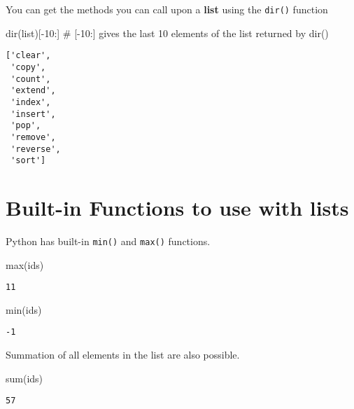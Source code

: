 \documentclass[
  letterpaper,
  DIV=11,
  numbers=noendperiod]{scrreprt}
\newenvironment{Shaded}{\begin{snugshade}}{\end{snugshade}}
\newcommand{\BuiltInTok}[1]{\textcolor[rgb]{0.00,0.23,0.31}{#1}}
\newcommand{\CommentTok}[1]{\textcolor[rgb]{0.37,0.37,0.37}{#1}}
\newcommand{\DecValTok}[1]{\textcolor[rgb]{0.68,0.00,0.00}{#1}}
\newcommand{\NormalTok}[1]{\textcolor[rgb]{0.00,0.23,0.31}{#1}}
\newcommand{\OperatorTok}[1]{\textcolor[rgb]{0.37,0.37,0.37}{#1}}
\begin{document}
You can get the methods you can call upon a \textbf{list} using the
\texttt{dir()} function

\begin{Shaded}
\begin{Highlighting}[]
\BuiltInTok{dir}\NormalTok{(}\BuiltInTok{list}\NormalTok{)[}\OperatorTok{{-}}\DecValTok{10}\NormalTok{:] }\CommentTok{\# [{-}10:] gives the last 10 elements of the list returned by dir()}
\end{Highlighting}
\end{Shaded}

\begin{verbatim}
['clear',
 'copy',
 'count',
 'extend',
 'index',
 'insert',
 'pop',
 'remove',
 'reverse',
 'sort']
\end{verbatim}

\section{Built-in Functions to use with
lists}\label{built-in-functions-to-use-with-lists}

Python has built-in \texttt{min()} and \texttt{max()} functions.

\begin{Shaded}
\begin{Highlighting}[]
\BuiltInTok{max}\NormalTok{(ids)}
\end{Highlighting}
\end{Shaded}

\begin{verbatim}
11
\end{verbatim}

\begin{Shaded}
\begin{Highlighting}[]
\BuiltInTok{min}\NormalTok{(ids)}
\end{Highlighting}
\end{Shaded}

\begin{verbatim}
-1
\end{verbatim}

Summation of all elements in the list are also possible.

\begin{Shaded}
\begin{Highlighting}[]
\BuiltInTok{sum}\NormalTok{(ids)}
\end{Highlighting}
\end{Shaded}

\begin{verbatim}
57
\end{verbatim}
\end{document}
